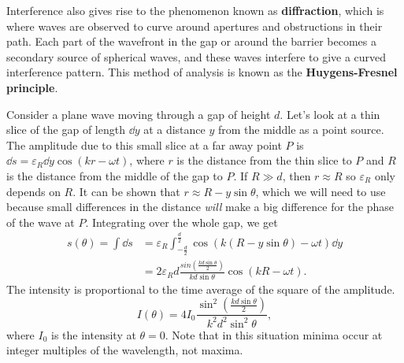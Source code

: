 \documentclass[../classical_mechanics.tex]{subfiles}
\begin{document}
        Interference also gives rise to the phenomenon known as \textbf{diffraction}, which is where waves are observed to curve around apertures and obstructions in their path.
        Each part of the wavefront in the gap or around the barrier becomes a secondary source of spherical waves, and these waves interfere to give a curved interference pattern.
        This method of analysis is known as the \textbf{Huygens-Fresnel principle}.

        Consider a plane wave moving through a gap of height $d$.
        Let's look at a thin slice of the gap of length $\dd{y}$ at a distance $y$ from the middle as a point source.
        The amplitude due to this small slice at a far away point $P$ is $\dd{s}=\varepsilon_R\dd{y}\cos(kr-\omega t)$, where $r$ is the distance from the thin slice to $P$ and $R$ is the distance from the middle of the gap to $P$.
        If $R\gg d$, then $r\approx R$ so $\varepsilon_R$ only depends on $R$.
        It can be shown that $r\approx R-y\sin\theta$, which we will need to use because small differences in the distance \textit{will} make a big difference for the phase of the wave at $P$.
        Integrating over the whole gap, we get
        \begin{align}
            s(\theta)=\int\dd{s}&=\varepsilon_R\int_{-\frac{d}{2}}^{\frac{d}{2}}\cos(k(R-y\sin\theta)-\omega t)\dd{y}\\
            &=2\varepsilon_R d\frac{sin\left(\frac{kd\sin\theta}{2}\right)}{kd\sin\theta}\cos(kR-\omega t).
        \end{align}
        The intensity is proportional to the time average of the square of the amplitude.
        \begin{equation}
            I(\theta)=4I_0\frac{\sin^2\left(\frac{kd\sin\theta}{2}\right)}{k^2d^2\sin^2\theta},
        \end{equation}
        where $I_0$ is the intensity at $\theta=0$.
        Note that in this situation minima occur at integer multiples of the wavelength, not maxima.
\end{document}
